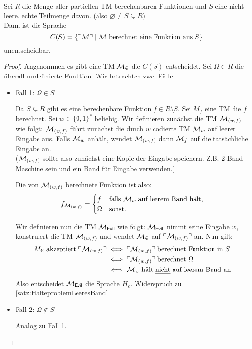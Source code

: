 \begin{Satz}\ \\
  Sei $R$ die Menge aller partiellen \ac{TM}-berechenbaren Funktionen und $S$
  eine nicht-leere, echte Teilmenge davon. (also $\varnothing \neq S \subsetneq R$)\\
  Dann ist die Sprache
  $$C(S)=\{\ulcorner \mathcal{M} \urcorner \mid \mathcal{M} \text{ berechnet eine Funktion aus }S\}$$
  unentscheidbar.
\end{Satz}
\begin{proof}
  Angenommen es gibt eine \ac{TM} $\mathcal{M}_\text{€}$ die $C(S)$ entscheidet.
  Sei $\Omega \in R$ die überall undefinierte Funktion. 
  Wir betrachten zwei Fälle
  \begin{itemize}
   \item Fall 1: $\Omega \in S$
   
     Da $S\subsetneq R$ gibt es eine berechenbare Funktion $ f \in R \setminus S$.
     Sei $M_f$ eine \ac{TM} die $f$  berechnet.
     Sei $w\in\{0,1\}^*$ beliebig.
     Wir definieren zunächst die \ac{TM} $\mathcal{M}_{(w, f)}$ wie folgt: 
     $\mathcal{M}_{(w, f)}$ führt zunächst die durch $w$ codierte \ac{TM} $\mathcal{M}_w$ auf leerer Eingabe aus. 
     Falls $\mathcal{M}_w$ anhält, wendet $\mathcal{M}_{(w, f)}$ dann $\mathcal{M}_f$ auf die tatsächliche Eingabe an.\\
     ($\mathcal{M}_{(w, f)}$ sollte also zunächst eine Kopie der Eingabe speichern.
     Z.B. 2-Band Maschine sein und ein Band für Eingabe verwenden.)
     
     Die von $\mathcal{M}_{(w, f)}$ berechnete Funktion ist also:
     $$f_{\mathcal{M}_{(w, f)}}=\begin{cases}
                      f & \text{falls } \mathcal{M}_w \text{ auf leerem Band hält,}\\
                      \Omega & \text{sonst.}
                      \end{cases}$$
     
     Wir definieren nun die \ac{TM} $\mathcal{M}_\textsf{Evil}$ wie folgt:
     $\mathcal{M}_\textsf{Evil}$ nimmt seine Eingabe $w$, konstruiert die \ac{TM} $\mathcal{M}_{(w, f)}$ und wendet $\mathcal{M}_\text{€}$ auf $\ulcorner \mathcal{M}_{(w, f)} \urcorner$ an.
     Nun gilt:
     \begin{align*}
      M_\text{€} \text{ akzeptiert } \godel{\M_{(w, f)}}
      &\iff \godel{\M_{(w, f)}} \text{ berechnet Funktion in }S\\
      &\iff \godel{\M_{(w, f)}} \text{ berechnet }\Omega\\ %
      &\iff \M_w \text{ hält \emph{nicht} auf leerem Band an}
    \end{align*}
    Also entscheidet $\mathcal{M}_\textsf{Evil}$ die Sprache $H_\varepsilon$. Widerspruch zu \autoref{satz:HalteproblemLeeresBand}
    \item Fall 2: $\Omega \notin S$
    
    Analog zu Fall 1. \qedhere
  \end{itemize}
\end{proof}



